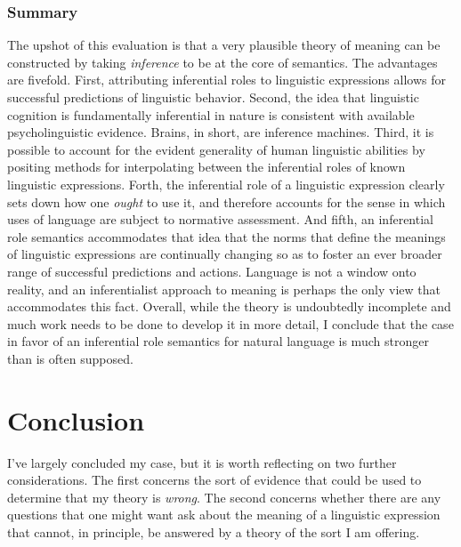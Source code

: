 \subsubsection{Summary}

The upshot of this evaluation is that a very plausible theory of meaning can be constructed by taking \textit{inference} to be at the core of semantics. The advantages are fivefold. First, attributing inferential roles to linguistic expressions allows for successful predictions of linguistic behavior. Second, the idea that linguistic cognition is fundamentally inferential in nature is consistent with available psycholinguistic evidence. Brains, in short, are inference machines. Third, it is possible to account for the evident generality of human linguistic abilities by positing methods for interpolating between the inferential roles of known linguistic expressions. Forth, the inferential role of a linguistic expression clearly sets down how one \textit{ought} to use it, and therefore accounts for the sense in which uses of language are subject to normative assessment. And fifth, an inferential role semantics accommodates that idea that the norms that define the meanings of linguistic expressions are continually changing so as to foster an ever broader range of successful predictions and actions. Language is not a window onto reality, and an inferentialist approach to meaning is perhaps the only view that accommodates this fact. Overall, while the theory is undoubtedly incomplete and much work needs to be done to develop it in more detail, I conclude that the case in favor of an inferential role semantics for natural language is much stronger than is often supposed. 

\section{Conclusion}

I've largely concluded my case, but it is worth reflecting on two further considerations. The first concerns the sort of evidence that could be used to determine that my theory is \textit{wrong}. The second concerns whether there are any questions that one might want ask about the meaning of a linguistic expression that cannot, in principle, be answered by a theory of the sort I am offering. 

